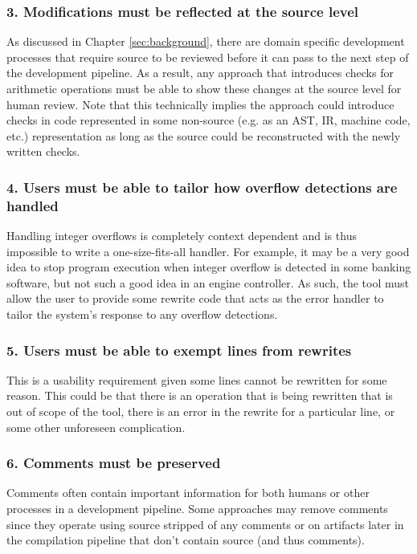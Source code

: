 \subsubsection{3. Modifications must be reflected at the source level}

As discussed in Chapter \ref{sec:background}, there are domain specific development processes that require source to be reviewed before it can pass to the next step of the development pipeline. As a result, any approach that introduces checks for arithmetic operations must be able to show these changes at the source level for human review. Note that this technically implies the approach could introduce checks in code represented in some non-source (e.g. as an AST, IR, machine code, etc.) representation as long as the source could be reconstructed with the newly written checks.

\subsubsection{4. Users must be able to tailor how overflow detections are handled}

Handling integer overflows is completely context dependent and is thus impossible to write a one-size-fits-all handler. For example, it may be a very good idea to stop program execution when integer overflow is detected in some banking software, but not such a good idea in an engine controller. As such, the tool must allow the user to provide some rewrite code that acts as the error handler to tailor the system's response to any overflow detections.

\subsubsection{5. Users must be able to exempt lines from rewrites }

This is a usability requirement given some lines cannot be rewritten for some reason. This could be that there is an operation that is being rewritten that is out of scope of the tool, there is an error in the rewrite for a particular line, or some other unforeseen complication.

\subsubsection{6. Comments must be preserved}

Comments often contain important information for both humans or other processes in a development pipeline. Some approaches may remove comments since they operate using source stripped of any comments or on artifacts later in the compilation pipeline that don't contain source (and thus comments).

